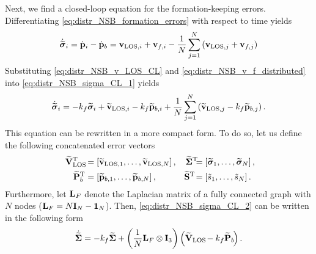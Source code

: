 Next, we find a closed-loop equation for the formation-keeping errors.
Differentiating \eqref{eq:distr_NSB_formation_errors} with respect to time yields
\begin{equation}
    \dot{\widetilde{\bm{\sigma}}}_i = \dot{\mathbf{p}}_i - \dot{\mathbf{p}}_b = \mathbf{v}_{{\rm LOS}, i} + \mathbf{v}_{f, i} - \frac{1}{N}\sum_{j=1}^N \left(\mathbf{v}_{{\rm LOS}, j} + \mathbf{v}_{f, j}\right)
    \label{eq:distr_NSB_sigma_CL_1}
\end{equation}
Substituting \eqref{eq:distr_NSB_v_LOS_CL} and \eqref{eq:distr_NSB_v_f_distributed} into \eqref{eq:distr_NSB_sigma_CL_1} yields
\begin{equation}
    \dot{\widetilde{\bm{\sigma}}}_i = -k_f \widetilde{\bm{\sigma}}_i + \widetilde{\mathbf{v}}_{{\rm LOS}, i} - k_f \widetilde{\mathbf{p}}_{b, i} + \frac{1}{N}\sum_{j=1}^N \left(\widetilde{\mathbf{v}}_{{\rm LOS}, j} - k_f \widetilde{\mathbf{p}}_{b, j}\right).
    \label{eq:distr_NSB_sigma_CL_2}
\end{equation}
This equation can be rewritten in a more compact form.
To do so, let us define the following concatenated error vectors
\begin{subequations}
    \begin{align}
        \widetilde{\mat{V}}_{\rm LOS\!}\T &= \left[\widetilde{\ivel}_{{\rm LOS}, 1}, \ldots, \widetilde{\ivel}_{{\rm LOS}, N}\right], &
        \widetilde{\bs{\Sigma}}\T\!\!\! &= \left[\widetilde{\bs{\sigma}}_1, \ldots, \widetilde{\bs{\sigma}}_N\right]\mathrlap{,} \\
        \widetilde{\mat{P}}_{b\!}\T &= \left[\widetilde{\mat{p}}_{b, 1}, \ldots, \widetilde{\mat{p}}_{b, N}\right], &
        \widetilde{\mat{S}}\T\! &= \left[\Tilde{s}_1, \ldots, \Tilde{s}_N\right].
    \end{align}
\end{subequations}
Furthermore, let $\mathbf{L}_{F}$ denote the Laplacian matrix of a fully connected graph with $N$ nodes
($
    \mathbf{L}_{F} = N \mathbf{I}_N - \mathbf{1}_N
$).
Then, \eqref{eq:distr_NSB_sigma_CL_2} can be written in the following form
\begin{equation}
    \dot{\widetilde{\bm{\Sigma}}} = - k_f \widetilde{\bm{\Sigma}} + \left(\frac{1}{N}\mathbf{L}_{F} \otimes \mathbf{I}_3\right) \left(\widetilde{\mathbf{V}}_{\rm LOS\!} - k_f \widetilde{\mathbf{P}}_{b\!} \right).
    \label{eq:distr_NSB_sigma_CL}
\end{equation}

